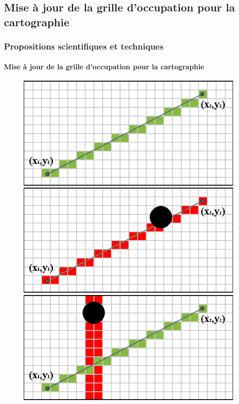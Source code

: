 \documentclass{beamer}
\begin{document}
		\subsection{Mise à jour de la grille d'occupation pour la cartographie}
			\begin{frame}
				\frametitle{Propositions scientifiques et techniques}
				\framesubtitle{Mise à jour de la grille d'occupation pour la cartographie}
				\begin{figure}
					\centering
					\begin{overprint}
						 \includegraphics[width=0.95\linewidth]{graphics/Bresenham_line.png}
						\onslide<2> \includegraphics[width=0.95\linewidth]{graphics/Bresenham_line_2.png}
						\onslide<3> \includegraphics[width=0.95\linewidth]{graphics/Bresenham_line_3.png}

\end{overprint}
\end{figure}
\end{frame}
\end{document}
